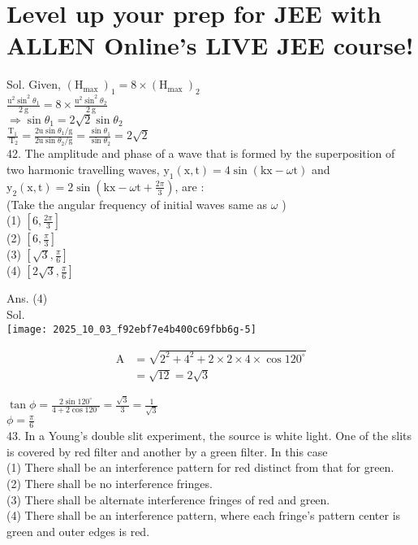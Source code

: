 \documentclass[10pt]{article}
\begin{document}
\section*{Level up your prep for JEE with ALLEN Online's LIVE JEE course!}
Sol. Given, \(\left(\mathrm{H}_{\text {max }}\right)_{1}=8 \times\left(\mathrm{H}_{\text {max }}\right)_{2}\)\\
\(\frac{\mathrm{u}^{2} \sin ^{2} \theta_{1}}{2 \mathrm{~g}}=8 \times \frac{\mathrm{u}^{2} \sin ^{2} \theta_{2}}{2 \mathrm{~g}}\)\\
\(\Rightarrow \sin \theta_{1}=2 \sqrt{2} \sin \theta_{2}\)\\
\(\frac{\mathrm{T}_{1}}{\mathrm{~T}_{2}}=\frac{2 \mathrm{u} \sin \theta_{1} / \mathrm{g}}{2 \mathrm{u} \sin \theta_{2} / \mathrm{g}}=\frac{\sin \theta_{1}}{\sin \theta_{2}}=2 \sqrt{2}\)\\
42. The amplitude and phase of a wave that is formed by the superposition of two harmonic travelling waves, \(\mathrm{y}_{1}(\mathrm{x}, \mathrm{t})=4 \sin (\mathrm{kx}-\omega \mathrm{t})\) and\\
\(\mathrm{y}_{2}(\mathrm{x}, \mathrm{t})=2 \sin \left(\mathrm{kx}-\omega \mathrm{t}+\frac{2 \pi}{3}\right)\), are \(:\)\\
(Take the angular frequency of initial waves same as \(\omega\) )\\
(1) \(\left[6, \frac{2 \pi}{3}\right]\)\\
(2) \(\left[6, \frac{\pi}{3}\right]\)\\
(3) \(\left[\sqrt{3}, \frac{\pi}{6}\right]\)\\
(4) \(\left[2 \sqrt{3}, \frac{\pi}{6}\right]\)

Ans. (4)\\
Sol.\\
\texttt{[image: 2025\_10\_03\_f92ebf7e4b400c69fbb6g-5]}

\[
\begin{aligned}
\mathrm{A} & =\sqrt{2^{2}+4^{2}+2 \times 2 \times 4 \times \cos 120^{\circ}} \\
& =\sqrt{12}=2 \sqrt{3}
\end{aligned}
\]

\(\tan \phi=\frac{2 \sin 120^{\circ}}{4+2 \cos 120^{\circ}}=\frac{\sqrt{3}}{3}=\frac{1}{\sqrt{3}}\)\\
\(\phi=\frac{\pi}{6}\)\\
43. In a Young's double slit experiment, the source is white light. One of the slits is covered by red filter and another by a green filter. In this case\\
(1) There shall be an interference pattern for red distinct from that for green.\\
(2) There shall be no interference fringes.\\
(3) There shall be alternate interference fringes of red and green.\\
(4) There shall be an interference pattern, where each fringe's pattern center is green and outer edges is red.
\end{document}
